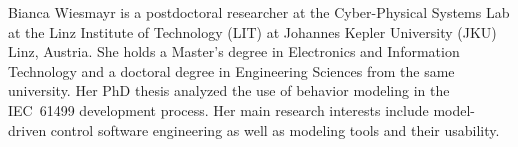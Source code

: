 \documentclass{ieeeojies}
\begin{document}
\begin{IEEEbiography}{Bianca Wiesmayr} is a postdoctoral researcher at the Cyber-Physical Systems Lab at the Linz Institute of Technology (LIT) at Johannes Kepler University (JKU) Linz, Austria. She holds a Master’s degree in Electronics and Information Technology and a doctoral degree in Engineering Sciences from the same university. Her PhD thesis analyzed the use of behavior modeling in the IEC~61499 development process. Her main research interests include model-driven control software engineering as well as modeling tools and their usability.
\end{IEEEbiography}
\end{document}
